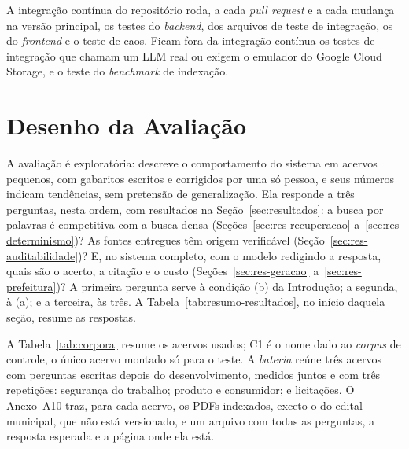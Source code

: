 \documentclass[12pt]{article}
\begin{document}
A integração contínua do repositório roda, a cada \emph{pull request} e a cada mudança na versão principal, os testes do \emph{backend}, \testesIntegracaoCI{} dos arquivos de teste de integração, os do \emph{frontend} e o teste de caos. Ficam fora da integração contínua os testes de integração que chamam um LLM real ou exigem o emulador do Google Cloud Storage, e o teste do \emph{benchmark} de indexação.

\section{Desenho da Avaliação}
\label{sec:avaliacao}

A avaliação é exploratória: descreve o comportamento do sistema em acervos pequenos, com gabaritos escritos e corrigidos por uma só pessoa, e seus números indicam tendências, sem pretensão de generalização. Ela responde a três perguntas, nesta ordem, com resultados na Seção~\ref{sec:resultados}: a busca por palavras é competitiva com a busca densa (Seções~\ref{sec:res-recuperacao} a~\ref{sec:res-determinismo})? As fontes entregues têm origem verificável (Seção~\ref{sec:res-auditabilidade})? E, no sistema completo, com o modelo redigindo a resposta, quais são o acerto, a citação e o custo (Seções~\ref{sec:res-geracao} a~\ref{sec:res-prefeitura})? A primeira pergunta serve à condição (b) da Introdução; a segunda, à (a); e a terceira, às três. A Tabela~\ref{tab:resumo-resultados}, no início daquela seção, resume as respostas.

A Tabela~\ref{tab:corpora} resume os acervos usados; C1 é o nome dado ao \emph{corpus} de controle, o único acervo montado só para o teste. A \emph{bateria} reúne três acervos com perguntas escritas depois do desenvolvimento, medidos juntos e com três repetições: segurança do trabalho; produto e consumidor; e licitações. O Anexo~A10 traz, para cada acervo, os PDFs indexados, exceto o do edital municipal, que não está versionado, e um arquivo com todas as perguntas, a resposta esperada e a página onde ela está.
\end{document}

